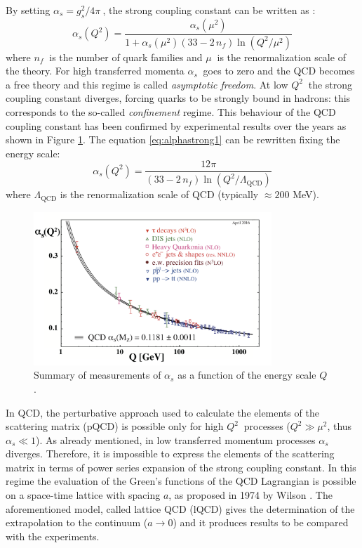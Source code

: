 By setting $\alpha_{s} = g^{2}_{s}/4\pi\ $, the strong coupling constant can be written as \cite{pdg}:
\begin{equation} \label{eq:alphastrong1}
    \alpha_{s}(Q^{2}) = \frac{\alpha_{s}(\mu^{2})}{1 + \alpha_{s}(\mu^{2})(33 - 2\,n_{f})
    \ln(Q^{2}/\mu^{2})}
\end{equation}
where $n_{f}\ $ is the number of quark families and $\mu\ $ is the renormalization scale of 
the theory.
For high transferred momenta $\alpha_{s}\ $ goes to zero and the QCD becomes a free theory and 
this regime is called \textit{asymptotic freedom}. At low $Q^{2}\ $ the strong coupling constant diverges,
forcing quarks to be strongly bound in hadrons: this corresponds to the so-called \textit{confinement} regime. 
This behaviour of the QCD coupling constant has been confirmed by experimental results over the
years as shown in Figure \ref{fig:alpharun}.
The equation \ref{eq:alphastrong1} can be rewritten fixing the energy scale:
\begin{equation} \label{eq:alphastrong2}
    \alpha_{s}(Q^{2}) = \frac{12 \pi}{(33 - 2\,n_{f})\ln(Q^{2}/\Lambda_{\mathrm{QCD}})}
\end{equation}
where $\Lambda_{\mathrm{QCD}}$ is the renormalization scale of QCD (typically $\approx 200$ MeV).

\begin{figure}
    \captionsetup{justification=centering}
    \centering
    \includegraphics[width=0.8\textwidth]{gfx/alpharun}
	\caption{Summary of measurements of $\alpha_{s}$ as a function of the energy scale $Q$ \cite{pdg}.}
	\label{fig:alpharun}
\end{figure}

In QCD, the perturbative approach used to calculate the elements of the scattering matrix (pQCD) is 
possible only for high $Q^{2}\ $ processes ($Q^{2} \gg \mu^{2}$, thus $\alpha_{s} \ll 1$).
As already mentioned, in low transferred momentum processes $\alpha_{s}$ diverges. 
Therefore, it is impossible to express the elements of the scattering matrix in terms of power series
expansion of the strong coupling constant.
In this regime the evaluation of the Green’s functions of the QCD Lagrangian is possible
on a space-time lattice with spacing $a$, as proposed in 1974 by Wilson \cite{lattice}.
The aforementioned model, called lattice QCD (lQCD) gives the determination of the extrapolation to 
the continuum ($a \rightarrow 0$) and it produces results to be compared with the experiments.

